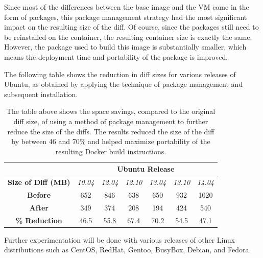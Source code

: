\documentclass[\myfontsize, letterpaper]{article}
\begin{document}
Since most of the differences between the base image and the VM come in the form of packages, this package management strategy had the most significant impact on the resulting size of the diff. Of course, since the packages still need to be reinstalled on the container, the resulting container size is exactly the same. However, the package used to build this image is substantially smaller, which means the deployment time and portability of the package is improved.

The following table shows the reduction in diff sizes for various releases of Ubuntu, as obtained by applying the technique of package management and subsequent installation.

\begin{table}[h]
\centering
    \begin{tabular}{| c | c | c | c | c | c | c |}
    \hline
& \multicolumn{6}{|c|}{\bfseries Ubuntu Release} \\ \hline
    \bfseries Size of Diff (MB) & \itshape 10.04 & \itshape 12.04 & \itshape 12.10 & \itshape 13.04 & \itshape 13.10 & \itshape 14.04 \\ \hline
    \bfseries Before & 652 & 846 & 638 & 650 & 932 & 1020\\ \hline
    \bfseries After & 349 & 374 & 208 & 194 & 424 & 540  \\ \hline \hline
    \bfseries \% Reduction & 46.5 & 55.8 & 67.4 & 70.2 & 54.5 & 47.1\\
    \hline
    \end{tabular}
\caption{The table above shows the space savings, compared to the original diff size, of using a method of package management to further reduce the size of the diffs. The results reduced the size of the diff by between 46 and 70\%  and helped maximize portability of the resulting Docker build instructions.}
\label{table:diff}
\end{table}

Further experimentation will be done with various releases of other Linux distributions such as CentOS, RedHat, Gentoo, BusyBox, Debian, and Fedora.
\end{document}

